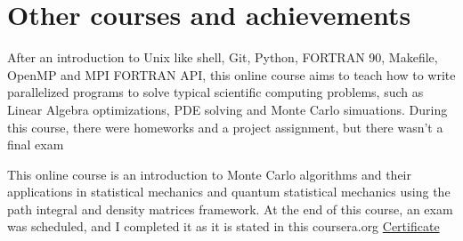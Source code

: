 \documentclass[11pt,a4paper]{moderncv}
\begin{document}
\section{Other courses and achievements}
{\small After an introduction to Unix like shell, Git, Python, FORTRAN 90, Makefile, OpenMP and MPI FORTRAN API, this online course aims to teach how to write parallelized programs to solve typical scientific computing problems, such as Linear Algebra optimizations, PDE solving and Monte Carlo simuations. During this course, there were homeworks and a project assignment, but there wasn't a final exam}

{\small This online course is an introduction to Monte Carlo algorithms and their applications in statistical mechanics and quantum statistical mechanics using the path integral and density matrices framework. At the end of this course, an exam was scheduled, and I completed it as it is stated in this coursera.org \textcolor{blue}{\href{http://dgiannelli.github.io/coursera_smac.pdf}{Certificate}}}

\end{document}
